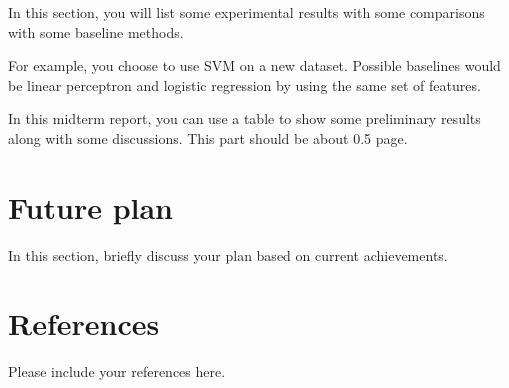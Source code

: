 \documentclass[11pt]{article}
\begin{document}
In this section, you will list some experimental results with
some comparisons with some baseline methods.

For example, you choose to use SVM on a new dataset. Possible
baselines would be linear perceptron and logistic regression by
using the same set of features.

In this midterm report, you can use a table to show some
preliminary results along with some discussions. This part should
be about 0.5 page.

\section{Future plan}

In this section, briefly discuss your plan based on current
achievements.

\section{References}

Please include your references here.
\end{document}
